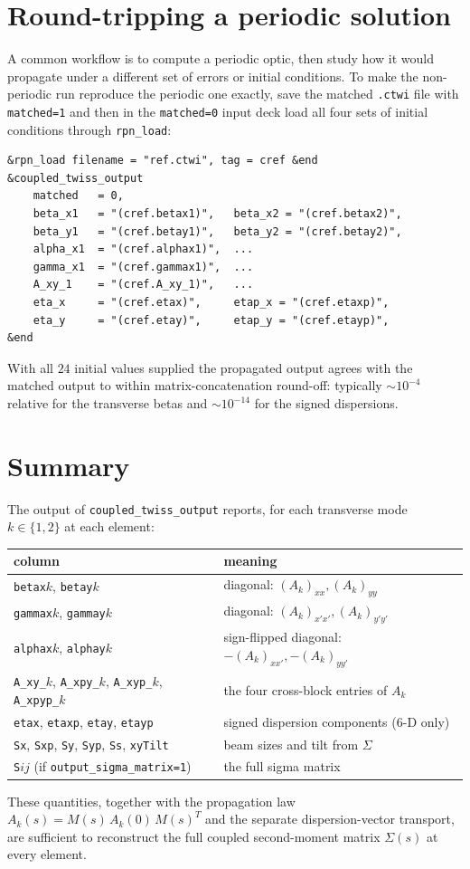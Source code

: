 \documentclass[11pt]{article}
\begin{document}
\section{Round-tripping a periodic solution}

A common workflow is to compute a periodic optic, then study how it would
propagate under a different set of errors or initial conditions. To make
the non-periodic run reproduce the periodic one exactly, save the matched
\verb|.ctwi| file with \verb|matched=1| and then in the \verb|matched=0|
input deck load all four sets of initial conditions through \verb|rpn_load|:
\begin{verbatim}
&rpn_load filename = "ref.ctwi", tag = cref &end
&coupled_twiss_output
    matched   = 0,
    beta_x1   = "(cref.betax1)",   beta_x2 = "(cref.betax2)",
    beta_y1   = "(cref.betay1)",   beta_y2 = "(cref.betay2)",
    alpha_x1  = "(cref.alphax1)",  ...
    gamma_x1  = "(cref.gammax1)",  ...
    A_xy_1    = "(cref.A_xy_1)",   ...
    eta_x     = "(cref.etax)",     etap_x = "(cref.etaxp)",
    eta_y     = "(cref.etay)",     etap_y = "(cref.etayp)",
&end
\end{verbatim}
With all $24$ initial values supplied the propagated output agrees with the
matched output to within matrix-concatenation round-off: typically
$\sim 10^{-4}$ relative for the transverse betas and
$\sim 10^{-14}$ for the signed dispersions.

\section{Summary}

The output of \verb|coupled_twiss_output| reports, for each transverse mode
$k\in\{1,2\}$ at each element:

\begin{center}
\begin{tabular}{ll}
\hline
column & meaning \\
\hline
\verb|betax|$k$, \verb|betay|$k$    & diagonal: $(A_k)_{xx},(A_k)_{yy}$ \\
\verb|gammax|$k$, \verb|gammay|$k$  & diagonal: $(A_k)_{x'x'},(A_k)_{y'y'}$ \\
\verb|alphax|$k$, \verb|alphay|$k$  & sign-flipped diagonal: $-(A_k)_{xx'},-(A_k)_{yy'}$ \\
\verb|A_xy_|$k$, \verb|A_xpy_|$k$,
\verb|A_xyp_|$k$, \verb|A_xpyp_|$k$ & the four cross-block entries of $A_k$ \\
\verb|etax|, \verb|etaxp|, \verb|etay|, \verb|etayp| & signed dispersion components (6-D only) \\
\verb|Sx|, \verb|Sxp|, \verb|Sy|, \verb|Syp|, \verb|Ss|, \verb|xyTilt| & beam sizes and tilt from $\Sigma$ \\
\verb|S|$ij$ (if \verb|output_sigma_matrix=1|) & the full sigma matrix \\
\hline
\end{tabular}
\end{center}

These quantities, together with the propagation law
$A_k(s)=M(s)\,A_k(0)\,M(s)^T$ and the separate dispersion-vector transport,
are sufficient to reconstruct the full coupled second-moment matrix
$\Sigma(s)$ at every element.
\end{document}
